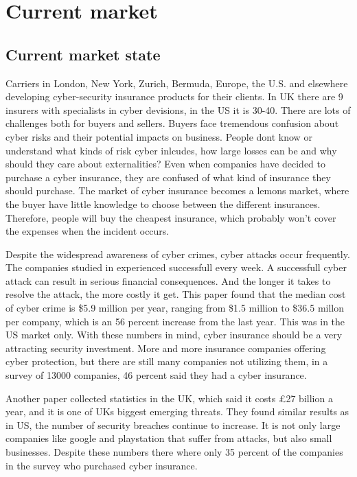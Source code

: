 \chapter{Current market}
\label{chp:hvahardenneaasi??} 
\section{Current market state}
Carriers in London, New York, Zurich, Bermuda, Europe, the U.S. and 
elsewhere developing cyber-security insurance products for their clients.
In UK there are 9 insurers with specialists in cyber devisions, 
in the US it is 30-40. \cite{evolvingcyber}
There are lots of challenges both for buyers and sellers. 
Buyers face tremendous confusion about cyber risks and their potential impacts on business. 
People dont know or understand what kinds of risk cyber inlcudes, 
how large losses can be and why should they care about externalities?
\cite{Cyberworkshop} 
Even when companies have decided to purchase a cyber insurance, they are confused of what kind of insurance they should purchase.
The market of cyber insurance becomes a lemons market, where the buyer have little knowledge to choose between the different insurances. 
Therefore, people will buy the cheapest insurance, which probably won't cover the expenses when the incident occurs. 

Despite the widespread awareness of cyber crimes, cyber attacks occur frequently. 
The companies studied in \cite{ccost} experienced successfull every week.
 A successfull cyber attack can result in serious financial consequences. 
 And the longer it takes to resolve the attack, the more costly it get. 
 This paper found that the median cost of cyber crime is \$5.9 million per year, 
 ranging from \$1.5 million to \$36.5 millon per company, 
 which is an 56 percent increase from the last year. This was in the US market only. 
 With these numbers in mind, cyber insurance should be a very attracting security investment. 
 More and more insurance companies offering cyber protection,
  but there are still many companies not utilizing them, in a survey of 13000 companies, 
  46 percent said they had a cyber insurance. \cite{compworld} 

Another paper \cite{evolvingcyber} collected statistics in the UK, which said it costs \pounds 27
 billion a year, and it is one of UKs biggest emerging threats. They found similar results as in US,
  the number of security breaches continue to increase.  It is not only large companies like google
   and playstation that suffer from attacks, but also small businesses. Despite these numbers
    there where only 35 percent of the companies in the survey who purchased cyber insurance. 

